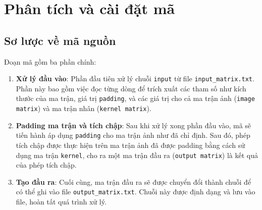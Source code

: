 \documentclass{article}
\begin{document}
\pagebreak
\section*{Phân tích và cài đặt mã}
\setcounter{section}{1}\setlength{\baselineskip}{15pt}
\setcounter{subsection}{0}
\setcounter{subsubsection}{0}
\large
\subsection{Sơ lược về mã nguồn}
\hspace{0.4cm} Đoạn mã gồm ba phần chính:

\begin{enumerate}
	\item \textbf{Xử lý đầu vào}: Phần đầu tiên xử lý chuỗi \texttt{input} từ file \texttt{input\_matrix.txt}. Phần này bao gồm việc đọc từng dòng để trích xuất các tham số như kích thước của ma trận, giá trị \texttt{padding}, và các giá trị cho cả ma trận ảnh (\texttt{image matrix}) và ma trận nhân (\texttt{kernel matrix}).
	
	\item \textbf{Padding ma trận và tích chập}: Sau khi xử lý xong phần đầu vào, mã sẽ tiến hành áp dụng \texttt{padding} cho ma trận ảnh như đã chỉ định. Sau đó, phép tích chập được thực hiện trên ma trận ảnh đã được padding bằng cách sử dụng ma trận \texttt{kernel}, cho ra một ma trận đầu ra (\texttt{output matrix}) là kết quả của phép tích chập.
	
	\item \textbf{Tạo đầu ra}: Cuối cùng, ma trận đầu ra sẽ được chuyển đổi thành chuỗi để có thể ghi vào file \texttt{output\_matrix.txt}. Chuỗi này được định dạng và lưu vào file, hoàn tất quá trình xử lý.
\end{enumerate}
\end{document}
